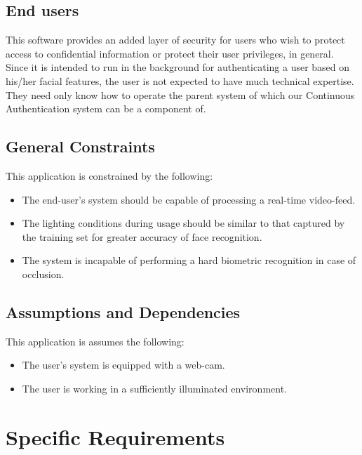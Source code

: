 \documentclass[12pt]{report}			%
\begin{document}
\subsection{ End users }
This software provides an added layer of security for users who wish to protect access to confidential information or protect their user privileges, in general. Since it is intended to run in the background for authenticating a user based on his/her facial features, the user is not expected to have much technical expertise. They need only know how to operate the parent system of which our Continuous Authentication system can be a component of.

\subsection{ General Constraints }
This application is constrained by the following:
\begin{itemize}
	\item The end-user's system should be capable of processing a real-time video-feed.
	\item The lighting conditions during usage should be similar to that captured by the training set for greater accuracy of face recognition.
	\item The system is incapable of performing a hard biometric recognition in case of occlusion.
\end{itemize}

\subsection{ Assumptions and Dependencies }
This application is assumes the following:
\begin{itemize}
	\item The user's system is equipped with a web-cam.
	\item The user is working in a sufficiently illuminated environment.
\end{itemize}

\section{ Specific Requirements }
\end{document}
